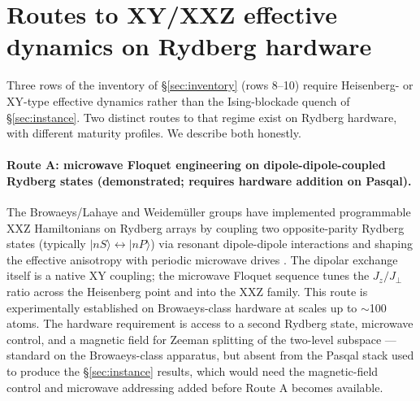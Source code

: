 \documentclass[10pt]{article}
\begin{document}
\section{Routes to XY/XXZ effective dynamics on Rydberg hardware}\label{sec:strongdrive}

Three rows of the inventory of \S\ref{sec:inventory} (rows 8--10) require Heisenberg- or XY-type effective dynamics rather than the Ising-blockade quench of \S\ref{sec:instance}. Two distinct routes to that regime exist on Rydberg hardware, with different maturity profiles. We describe both honestly.

\paragraph{Route A: microwave Floquet engineering on dipole-dipole-coupled Rydberg states (demonstrated; requires hardware addition on Pasqal).}
The Browaeys/Lahaye and Weidemüller groups have implemented programmable XXZ Hamiltonians on Rydberg arrays by coupling two opposite-parity Rydberg states (typically $|nS\rangle \leftrightarrow |nP\rangle$) via resonant dipole-dipole interactions and shaping the effective anisotropy with periodic microwave drives \cite{geier2021floquet,scholl2022microwave,chen2024spectroscopy}. The dipolar exchange itself is a native XY coupling; the microwave Floquet sequence tunes the $J_z/J_\perp$ ratio across the Heisenberg point and into the XXZ family. This route is experimentally established on Browaeys-class hardware at scales up to $\sim$100 atoms. The hardware requirement is access to a second Rydberg state, microwave control, and a magnetic field for Zeeman splitting of the two-level subspace --- standard on the Browaeys-class apparatus, but absent from the Pasqal stack used to produce the \S\ref{sec:instance} results, which would need the magnetic-field control and microwave addressing added before Route A becomes available.
\end{document}
